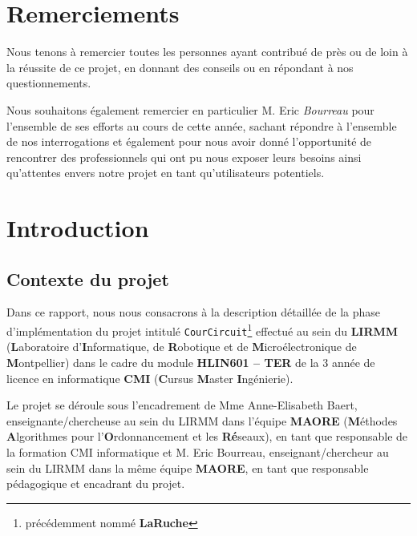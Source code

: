 \documentclass[a4paper,12pt]{report}
\theoremstyle{break}
\theoremstyle{break}
\theoremstyle{break}
\theoremstyle{break}
\theoremstyle{definition}
\theoremstyle{remark}
\begin{document}
\chapter*{Remerciements} 
Nous tenons à remercier toutes les personnes ayant contribué de près ou de loin à la réussite de ce projet, en donnant des conseils ou en répondant à nos questionnements.

  Nous souhaitons également remercier en particulier M. Eric \textit{Bourreau} pour l'ensemble de ses efforts au cours de cette année, sachant répondre à l'ensemble de nos interrogations et également pour nous avoir donné l'opportunité de rencontrer des professionnels qui ont pu nous exposer leurs besoins ainsi qu'attentes envers notre projet en tant qu'utilisateurs potentiels. 

\chapter{Introduction}
\setcounter{page}{1}
\section{Contexte du projet}
Dans ce rapport, nous nous consacrons à la description détaillée de la phase d'implémentation du projet intitulé \texttt{CourCircuit}\footnote{précédemment nommé \textbf{LaRuche}} effectué au sein du \textbf{LIRMM} (\textbf{L}aboratoire d'\textbf{I}nformatique, de \textbf{R}obotique et de \textbf{M}icroélectronique de \textbf{M}ontpellier) dans le cadre du module \textbf{HLIN601 -- TER} de la $3$\ieme{} année de licence en informatique \textbf{CMI} (\textbf{C}ursus \textbf{M}aster \textbf{I}ngénierie).

Le projet se déroule sous l'encadrement de Mme Anne-Elisabeth Baert, enseignante/chercheuse au sein du LIRMM dans l'équipe \textbf{MAORE} (\textbf{M}éthodes \textbf{A}lgorithmes pour l'\textbf{O}rdonnancement et les \textbf{Ré}seaux), en tant que responsable de la formation CMI informatique et M. Eric Bourreau, enseignant/chercheur au sein du LIRMM dans la même équipe \textbf{MAORE}, en tant que responsable pédagogique et encadrant du projet.
\end{document}
